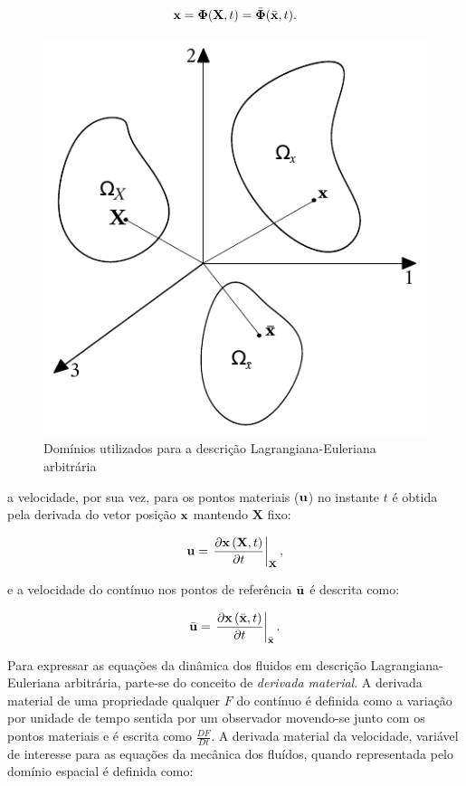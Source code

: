\documentclass[tese_patricia]{subfiles}%
\begin{document}
\begin{align}
	\mathbf{x} = \mathbf{\Phi}(\mathbf{X},t) = \bar{\mathbf{\Phi}}(\bar{\mathbf{x}},t). \label{eq:Pos}
\end{align}

\begin{figure}[htb!]
	\centering
	\includegraphics[scale=1.0]{Imagens/Cap2/ALE.pdf}	
	\caption{Domínios utilizados para a descrição Lagrangiana-Euleriana arbitrária}
	\label{fig:Ale}
\end{figure}

\noindent a velocidade, por sua vez, para os pontos materiais ($\mathbf{u}$) no instante $t$ é obtida pela derivada do vetor posição $\mathbf{x}$ mantendo $\mathbf{X}$ fixo:

\begin{align}
	\mathbf{u} = \left. \frac{\partial\mathbf{x}\left(\mathbf{X},t\right)}{\partial t} \right|_\mathbf{X}, \label{eq:vel}
\end{align}

\noindent e a velocidade do contínuo nos pontos de referência $\bar{\mathbf{u}}$ é descrita como:

\begin{align}
	\bar{\mathbf{u}} = \left. \frac{\partial\mathbf{x}\left({\bar{\mathbf{x}}},t\right)}{\partial t} \right| _{\bar{\mathbf{x}}}. \label{eq:velALE}
\end{align}

Para expressar as equações da dinâmica dos fluidos em descrição Lagrangiana-Euleriana arbitrária, parte-se do conceito de \textit{derivada material}. A derivada material de uma propriedade qualquer $F$ do contínuo é definida como a variação por unidade de tempo sentida por um observador movendo-se junto com os pontos materiais e é escrita como $\frac{DF}{Dt}$. A derivada material da velocidade, variável de interesse para as equações da mecânica dos fluídos, quando representada pelo domínio espacial é definida como:
\end{document}
